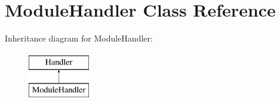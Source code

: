 \hypertarget{classModuleHandler}{}\section{Module\+Handler Class Reference}
\label{classModuleHandler}
Inheritance diagram for Module\+Handler\+:\begin{figure}[H]
\begin{center}
\leavevmode
\includegraphics[height=2.000000cm]{classModuleHandler}
\end{center}
\end{figure}

